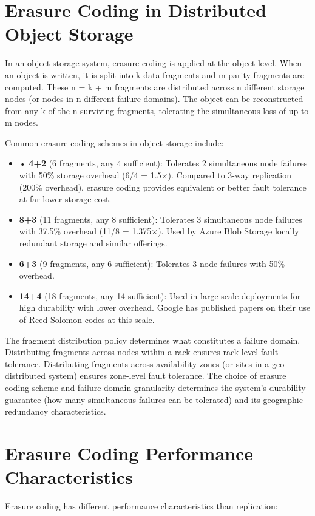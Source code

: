 \section{Erasure Coding in Distributed Object Storage}
In an object storage system, erasure coding is applied at the object level. When an object is written, it is split into k data fragments and m parity fragments are computed. These n = k + m fragments are distributed across n different storage nodes (or nodes in n different failure domains). The object can be reconstructed from any k of the n surviving fragments, tolerating the simultaneous loss of up to m nodes.

Common erasure coding schemes in object storage include:

\begin{itemize}
  \item • \textbf{4+2} (6 fragments, any 4 sufficient): Tolerates 2 simultaneous node failures with 50\% storage overhead (6/4 = 1.5$\times$). Compared to 3-way replication (200\% overhead), erasure coding provides equivalent or better fault tolerance at far lower storage cost.
  \item \textbf{8+3} (11 fragments, any 8 sufficient): Tolerates 3 simultaneous node failures with 37.5\% overhead (11/8 = 1.375$\times$). Used by Azure Blob Storage locally redundant storage and similar offerings.
  \item \textbf{6+3} (9 fragments, any 6 sufficient): Tolerates 3 node failures with 50\% overhead.
  \item \textbf{14+4} (18 fragments, any 14 sufficient): Used in large-scale deployments for high durability with lower overhead. Google has published papers on their use of Reed-Solomon codes at this scale.
\end{itemize}

The fragment distribution policy determines what constitutes a failure domain. Distributing fragments across nodes within a rack ensures rack-level fault tolerance. Distributing fragments across availability zones (or sites in a geo-distributed system) ensures zone-level fault tolerance. The choice of erasure coding scheme and failure domain granularity determines the system's durability guarantee (how many simultaneous failures can be tolerated) and its geographic redundancy characteristics.

\section{Erasure Coding Performance Characteristics}
Erasure coding has different performance characteristics than replication:

